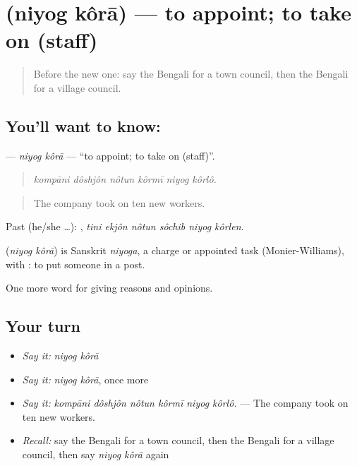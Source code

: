 \section[\texorpdfstring{\bn{নিয়োগ} \bn{করা} (niyog kôrā)}{নিয়োগ করা (niyog kôrā)}]{  (niyog kôrā) — to appoint; to take on (staff)}

\label{lesson:BN-C347-niyog-kora}



\begin{quote}
Before the new one: say the Bengali for a town council, then the Bengali for a village council.
\end{quote}

\subsection*{You'll want to know:  }
\textbf{ } — \emph{niyog kôrā} — \textquotedblleft{}to appoint; to take on (staff)\textquotedblright{}.

\begin{quote}
     
\end{quote}

\begin{quote}
\emph{kompāni dôshjôn nôtun kôrmī niyog kôrlô.}
\end{quote}

\begin{quote}
The company took on ten new workers.
\end{quote}

Past (he/she …):      , \emph{tini ekjôn nôtun sôchib niyog kôrlen}.

\begin{cousinweb}
\textbf{ } (\emph{niyog kôrā}) is Sanskrit \emph{niyoga}, a charge or appointed task (Monier-Williams), with : to put someone in a post.
\end{cousinweb}

\begin{grammarlens}[title={What you've built}]
One more word for giving reasons and opinions.
\end{grammarlens}

\subsection*{Your turn}
\begin{itemize}
\raggedright
  \item \emph{Say it:} \emph{niyog kôrā}
  \item \emph{Say it:} \emph{niyog kôrā}, once more
  \item \emph{Say it:} \emph{kompāni dôshjôn nôtun kôrmī niyog kôrlô.} — The company took on ten new workers.
  \item \emph{Recall:} say the Bengali for a town council, then the Bengali for a village council, then say \emph{niyog kôrā} again
\end{itemize}

